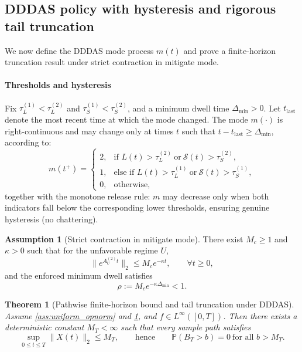 \documentclass[12pt,a4paper]{article}
\newtheorem{theorem}{Theorem}
\theoremstyle{definition}
\newtheorem{assumption}{Assumption}
\theoremstyle{remark}
\begin{document}
\subsection{DDDAS policy with hysteresis and rigorous tail truncation}
\label{subsec:dddas_policy}

We now define the DDDAS mode process $m(t)$ and prove a finite-horizon truncation result under strict contraction in mitigate mode.

\paragraph{Thresholds and hysteresis}
Fix $\tau_L^{(1)}<\tau_L^{(2)}$ and $\tau_S^{(1)}<\tau_S^{(2)}$, and a minimum dwell time $\Delta_{\min}>0$.
Let $t_{\mathrm{last}}$ denote the most recent time at which the mode changed. The mode $m(\cdot)$ is right-continuous and may change
only at times $t$ such that $t-t_{\mathrm{last}}\ge \Delta_{\min}$, according to:
\[
m(t^+)=
\begin{cases}
	2, & \text{if } L(t)>\tau_L^{(2)}\ \text{or}\ \mathcal{S}(t)>\tau_S^{(2)},\\[2pt]
	1, & \text{else if } L(t)>\tau_L^{(1)}\ \text{or}\ \mathcal{S}(t)>\tau_S^{(1)},\\[2pt]
	0, & \text{otherwise},
\end{cases}
\]
together with the monotone release rule: $m$ may decrease only when both indicators fall below the corresponding lower thresholds,
ensuring genuine hysteresis (no chattering).

\begin{assumption}[Strict contraction in mitigate mode]
	\label{ass:strict_contraction}
	There exist $M_c\ge 1$ and $\kappa>0$ such that for the unfavorable regime $U$,
	\begin{equation}\label{eq:mitigate_contraction}
		\|e^{A_U^{(2)} t}\|_2\le M_c e^{-\kappa t},\qquad \forall t\ge 0,
	\end{equation}
	and the enforced minimum dwell satisfies
	\begin{equation}\label{eq:rho_condition}
		\rho:=M_c e^{-\kappa \Delta_{\min}}<1.
	\end{equation}
\end{assumption}

\begin{theorem}[Pathwise finite-horizon bound and tail truncation under DDDAS]
	\label{thm:dddas_trunc}
	Assume \ref{ass:uniform_opnorm} and \ref{ass:strict_contraction}, and $f\in L^\infty([0,T])$.
	Then there exists a deterministic constant $M_T<\infty$ such that every sample path satisfies
	\[
	\sup_{0\le t\le T}\|X(t)\|_2\le M_T,
	\qquad\text{hence}\qquad
	\mathbb{P}(B_T>b)=0\ \text{for all }b>M_T.
	\]
\end{theorem}
\end{document}
